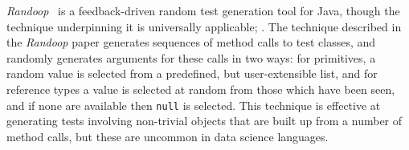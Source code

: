 \documentclass[sigplan,anonymous,review]{acmart}
\begin{document}
%
%

\emph{Randoop}~\cite{pacheco2007randoop} is a feedback-driven random test generation tool for Java, though the technique underpinning it is universally applicable; .
The technique described in the \emph{Randoop} paper generates sequences of method calls to test classes, and randomly generates arguments for these calls in two ways: for primitives, a random value is selected from a predefined, but user-extensible list, and for reference types a value is selected at random from those which have been seen, and if none are available then {\tt null} is selected.
This technique is effective at generating tests involving non-trivial objects that are built up from a number of method calls, but these are uncommon in data science languages.

\end{document}

